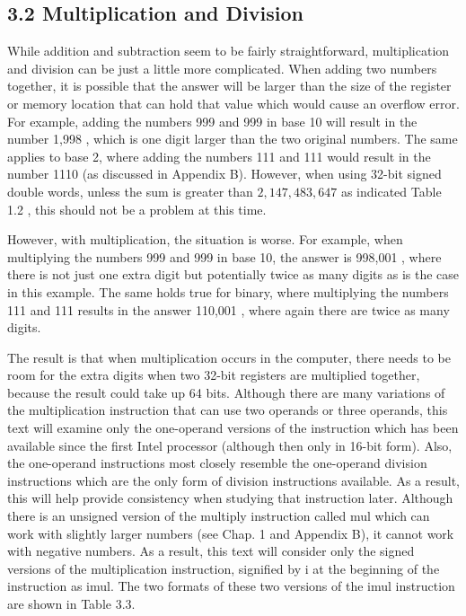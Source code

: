 \documentclass[10pt]{article}
\begin{document}
\subsection*{3.2 Multiplication and Division}
While addition and subtraction seem to be fairly straightforward, multiplication and division can be just a little more complicated. When adding two numbers together, it is possible that the answer will be larger than the size of the register or memory location that can hold that value which would cause an overflow error. For example, adding the numbers 999 and 999 in base 10 will result in the number 1,998 , which is one digit larger than the two original numbers. The same applies to base 2, where adding the numbers 111 and 111 would result in the number 1110 (as discussed in Appendix B). However, when using 32-bit signed double words, unless the sum is greater than $2,147,483,647$ as indicated Table 1.2 , this should not be a problem at this time.

However, with multiplication, the situation is worse. For example, when multiplying the numbers 999 and 999 in base 10, the answer is 998,001 , where there is not just one extra digit but potentially twice as many digits as is the case in this example. The same holds true for binary, where multiplying the numbers 111 and 111 results in the answer 110,001 , where again there are twice as many digits.

The result is that when multiplication occurs in the computer, there needs to be room for the extra digits when two 32-bit registers are multiplied together, because the result could take up 64 bits. Although there are many variations of the multiplication instruction that can use two operands or three operands, this text will examine only the one-operand versions of the instruction which has been available since the first Intel processor (although then only in 16-bit form). Also, the one-operand instructions most closely resemble the one-operand division instructions which are the only form of division instructions available. As a result, this will help provide consistency when studying that instruction later. Although there is an unsigned version of the multiply instruction called mul which can work with slightly larger numbers (see Chap. 1 and Appendix B), it cannot work with negative numbers. As a result, this text will consider only the signed versions of the multiplication instruction, signified by i at the beginning of the instruction as imul. The two formats of these two versions of the imul instruction are shown in Table 3.3.
\end{document}
